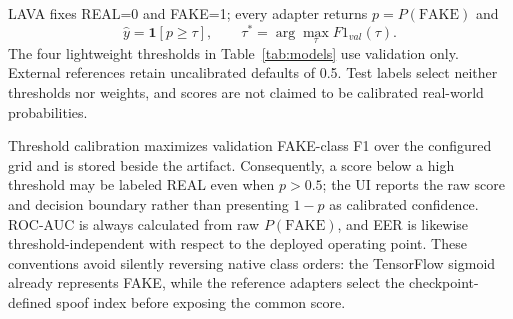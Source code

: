 \documentclass[10pt,journal,onecolumn,a4paper]{IEEEtran}
\begin{document}
LAVA fixes REAL=0 and FAKE=1; every adapter returns $p=P(\mathrm{FAKE})$ and
\begin{equation}
\hat y=\mathbf{1}[p\ge\tau],\qquad \tau^*=\arg\max_{\tau}F1_{val}(\tau).
\label{eq:decision}
\end{equation}
The four lightweight thresholds in Table~\ref{tab:models} use validation only. External references retain uncalibrated defaults of 0.5. Test labels select neither thresholds nor weights, and scores are not claimed to be calibrated real-world probabilities.

Threshold calibration maximizes validation FAKE-class F1 over the configured grid and is stored beside the artifact. Consequently, a score below a high threshold may be labeled REAL even when $p>0.5$; the UI reports the raw score and decision boundary rather than presenting $1-p$ as calibrated confidence. ROC-AUC is always calculated from raw $P(\mathrm{FAKE})$, and EER is likewise threshold-independent with respect to the deployed operating point. These conventions avoid silently reversing native class orders: the TensorFlow sigmoid already represents FAKE, while the reference adapters select the checkpoint-defined spoof index before exposing the common score.
\end{document}
